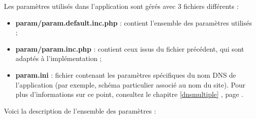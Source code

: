 Les paramètres utilisés dans l'application sont gérés avec 3 fichiers différents :
\begin{itemize}
\item \textbf{param/param.default.inc.php} : contient l'ensemble des paramètres utilisés ;
\item \textbf{param/param.inc.php} : contient ceux issus du fichier précédent, qui sont adaptés à l'implémentation ;
\item \textbf{param.ini} : fichier contenant les paramètres spécifiques du nom DNS de l'application (par exemple, schéma particulier associé au nom du site). Pour plus d'informations sur ce point, consultez le chapitre \ref{dnsmultiple} \textit{}, page \pageref{dnsmultiple}.
\end{itemize}

Voici la description de l'ensemble des paramètres :

